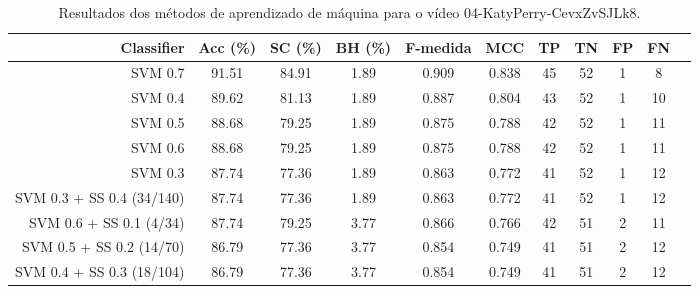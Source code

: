 \begin{table}[!htb]
\centering
\caption{Resultados dos métodos de aprendizado de máquina para o vídeo 04-KatyPerry-CevxZvSJLk8.}
\label{tab:04-KatyPerry-CevxZvSJLk8}
\begin{tabular}{r|c|c|c|c|c|c|c|c|c|c}
\hline\hline
Classifier & Acc (\%) & SC (\%) & BH (\%) & F-medida & MCC & TP & TN & FP & FN \\ \hline
SVM 0.7 & 91.51 & 84.91 & 1.89 & 0.909 & 0.838 & 45 & 52 & 1 & 8 \\ 
SVM 0.4 & 89.62 & 81.13 & 1.89 & 0.887 & 0.804 & 43 & 52 & 1 & 10 \\ 
SVM 0.5 & 88.68 & 79.25 & 1.89 & 0.875 & 0.788 & 42 & 52 & 1 & 11 \\ 
SVM 0.6 & 88.68 & 79.25 & 1.89 & 0.875 & 0.788 & 42 & 52 & 1 & 11 \\ 
SVM 0.3 & 87.74 & 77.36 & 1.89 & 0.863 & 0.772 & 41 & 52 & 1 & 12 \\ 
SVM 0.3 + SS 0.4 (34/140) & 87.74 & 77.36 & 1.89 & 0.863 & 0.772 & 41 & 52 & 1 & 12 \\ 
SVM 0.6 + SS 0.1 (4/34) & 87.74 & 79.25 & 3.77 & 0.866 & 0.766 & 42 & 51 & 2 & 11 \\ 
SVM 0.5 + SS 0.2 (14/70) & 86.79 & 77.36 & 3.77 & 0.854 & 0.749 & 41 & 51 & 2 & 12 \\ 
SVM 0.4 + SS 0.3 (18/104) & 86.79 & 77.36 & 3.77 & 0.854 & 0.749 & 41 & 51 & 2 & 12 \\ 
\hline\hline
\end{tabular}
\end{table}
